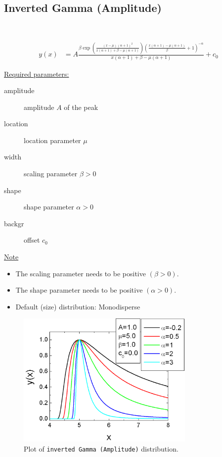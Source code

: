 \clearpage
\subsection{Inverted Gamma (Amplitude)} ~\\
\label{sec:InvertedGammaAmplitude}

\begin{align}
y(x) &= A\frac{\beta\exp\left(\frac{(x-\mu)(\alpha+1)^2}{x(\alpha+1)+\beta-\mu(\alpha+1)}\right)\left(\frac{x(\alpha+1)-\mu(\alpha+1)}{\beta}+1\right)^{-\alpha}}{x(\alpha+1)+\beta-\mu(\alpha+1)}
+c_0
\end{align}

\underline{Required parameters:}
\begin{description}
    \item[amplitude] amplitude $A$ of the peak
    \item[location] location parameter $\mu$
    \item[width] scaling parameter $\beta > 0$
    \item[shape] shape parameter $\alpha > 0$
    \item[backgr] offset $c_0$
\end{description}

\underline{Note}
\begin{itemize}
  \item The scaling parameter needs to be positive $(\beta > 0)$.
  \item The shape parameter needs to be positive $(\alpha > 0)$.
  \item Default (size) distribution: Monodisperse
\end{itemize}

\begin{figure}[htb]
\begin{center}
\includegraphics[width=0.768\textwidth]{invertedGammaAmplitude.png}
\end{center}
\caption{Plot of \texttt{inverted Gamma (Amplitude)} distribution.}
\label{fig:invertedGammaAmplitude}
\end{figure}

